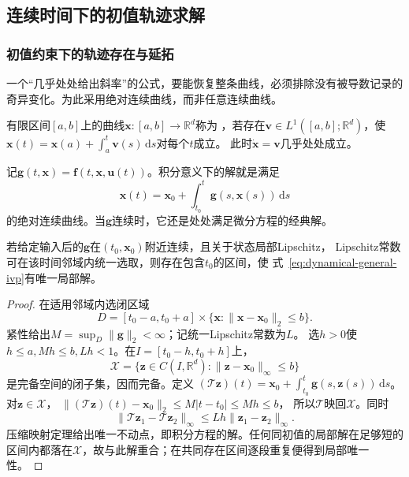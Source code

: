 \subsection{连续时间下的初值轨迹求解}


\subsubsection{初值约束下的轨迹存在与延拓}
一个“几乎处处给出斜率”的公式，要能恢复整条曲线，必须排除没有被导数记录的
奇异变化。为此采用绝对连续曲线，而非任意连续曲线。
\begin{definition}[绝对连续曲线]
  \label{def:dynamical-absolutely-continuous-curve}
  有限区间$[a,b]$上的曲线$\bm x:[a,b]\to\mathbb R^d$称为
  ，若存在$\bm v\in L^1([a,b];\mathbb R^d)$，使
  $\bm x(t)=\bm x(a)+\int_a^t\bm v(s)\,\mathrm ds$对每个$t$成立。
  此时$\dot{\bm x}=\bm v$几乎处处成立。
\end{definition}
记$\bm g(t,\bm x)=\bm f(t,\bm x,\bm u(t))$。积分意义下的解就是满足
\begin{equation}
  \bm x(t)=\bm x_0+\int_{t_0}^t\bm g(s,\bm x(s))\,\mathrm ds
  \label{eq:dynamical-ivp-integral-form}
\end{equation}
的绝对连续曲线。当$\bm g$连续时，它还是处处满足微分方程的经典解。

\begin{theorem}[局部存在唯一性]
  \label{thm:dynamical-picard-lindelof}
  若给定输入后的$\bm g$在$(t_0,\bm x_0)$附近连续，且关于状态局部Lipschitz，
  Lipschitz常数可在该时间邻域内统一选取，则存在包含$t_0$的区间，使
  式~\eqref{eq:dynamical-general-ivp}有唯一局部解。
\end{theorem}
\begin{proof}
  在适用邻域内选闭区域
  \[
    D=[t_0-a,t_0+a]\times
    \{\bm x:\|\bm x-\bm x_0\|_2\leq b\}.
  \]
  紧性给出$M=\sup_D\|\bm g\|_2<\infty$；记统一Lipschitz常数为$L$。
  选$h>0$使$h\leq a,Mh\leq b,Lh<1$。在$I=[t_0-h,t_0+h]$上，
  \[
    \mathcal X=\{\bm z\in C(I,\mathbb R^d):
       \|\bm z-\bm x_0\|_\infty\leq b\}
  \]
  是完备空间的闭子集，因而完备。定义
  $(\mathcal T\bm z)(t)=\bm x_0+\int_{t_0}^t\bm g(s,\bm z(s))\,\mathrm ds$。
  对$\bm z\in\mathcal X$，
  $\|(\mathcal T\bm z)(t)-\bm x_0\|_2\leq M|t-t_0|\leq Mh\leq b$，
  所以$\mathcal T$映回$\mathcal X$。同时
  \[
    \|\mathcal T\bm z_1-\mathcal T\bm z_2\|_\infty
    \leq Lh\|\bm z_1-\bm z_2\|_\infty.
  \]
  压缩映射定理给出唯一不动点，即积分方程的解。任何同初值的局部解在足够短的
  区间内都落在$\mathcal X$，故与此解重合；在共同存在区间逐段重复便得到局部唯一性。
\end{proof}

